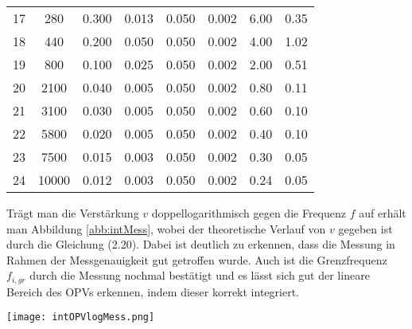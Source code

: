 \begin{center}
\begin{tabular}{l | c c c c c | c c}
        17 &    280 &  0.300 &      0.013 &   0.050 &      0.002 &   6.00 &  0.35 \\
        18 &    440 &  0.200 &      0.050 &   0.050 &      0.002 &   4.00 &  1.02 \\
        19 &    800 &  0.100 &      0.025 &   0.050 &      0.002 &   2.00 &  0.51 \\
        20 &   2100 &  0.040 &      0.005 &   0.050 &      0.002 &   0.80 &  0.11 \\
        21 &   3100 &  0.030 &      0.005 &   0.050 &      0.002 &   0.60 &  0.10 \\
        22 &   5800 &  0.020 &      0.005 &   0.050 &      0.002 &   0.40 &  0.10 \\
        23 &   7500 &  0.015 &      0.003 &   0.050 &      0.002 &   0.30 &  0.05 \\
        24 &  10000 &  0.012 &      0.003 &   0.050 &      0.002 &   0.24 &  0.05 \\
    \end{tabular}
    \label{tab:int}
\end{center}
Trägt man die Verstärkung $v$ doppellogarithmisch gegen die Frequenz $f$ auf erhält man Abbildung \ref{abb:intMess}, wobei der theoretische Verlauf von $v$ gegeben ist durch die Gleichung (2.20). Dabei ist deutlich zu erkennen, dass die Messung in Rahmen der Messgenauigkeit gut getroffen wurde. Auch ist die Grenzfrequenz $f_{i,gr}$ durch die Messung nochmal bestätigt und es lässt sich gut der lineare Bereich des OPVs erkennen, indem dieser korrekt integriert.
\newpage
\begin{center}
    \texttt{[image: intOPVlogMess.png]}
    \label{abb:intMess}
\end{center}
